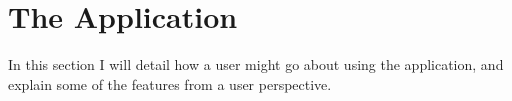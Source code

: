 \section{The Application}

In this section I will detail how a user might go about using the application, and explain some of the features from a user perspective.

